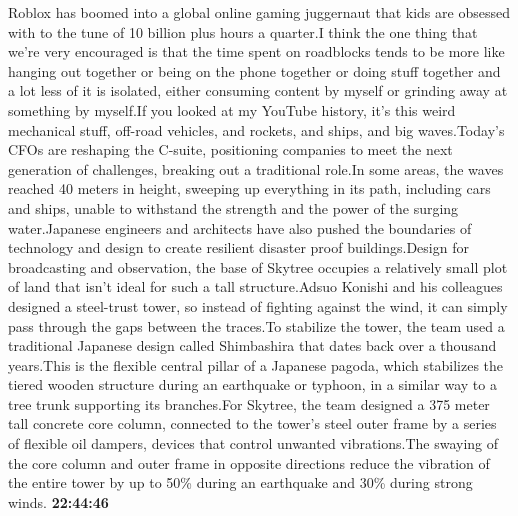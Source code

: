\documentclass{article}%
\begin{document}
Roblox has boomed into a global online gaming juggernaut that kids are obsessed with to the tune of 10 billion plus hours a quarter.I think the one thing that we're very encouraged is that the time spent on roadblocks tends to be more like hanging out together or being on the phone together or doing stuff together and a lot less of it is isolated, either consuming content by myself or grinding away at something by myself.If you looked at my YouTube history, it's this weird mechanical stuff, off{-}road vehicles, and rockets, and ships, and big waves.Today's CFOs are reshaping the C{-}suite, positioning companies to meet the next generation of challenges, breaking out a traditional role.In some areas, the waves reached 40 meters in height, sweeping up everything in its path, including cars and ships, unable to withstand the strength and the power of the surging water.Japanese engineers and architects have also pushed the boundaries of technology and design to create resilient disaster proof buildings.Design for broadcasting and observation, the base of Skytree occupies a relatively small plot of land that isn't ideal for such a tall structure.Adsuo Konishi and his colleagues designed a steel{-}trust tower, so instead of fighting against the wind, it can simply pass through the gaps between the traces.To stabilize the tower, the team used a traditional Japanese design called Shimbashira that dates back over a thousand years.This is the flexible central pillar of a Japanese pagoda, which stabilizes the tiered wooden structure during an earthquake or typhoon, in a similar way to a tree trunk supporting its branches.For Skytree, the team designed a 375 meter tall concrete core column, connected to the tower's steel outer frame by a series of flexible oil dampers, devices that control unwanted vibrations.The swaying of the core column and outer frame in opposite directions reduce the vibration of the entire tower by up to 50\% during an earthquake and 30\% during strong winds.%
\textbf{22:44:46}%
\end{document}

